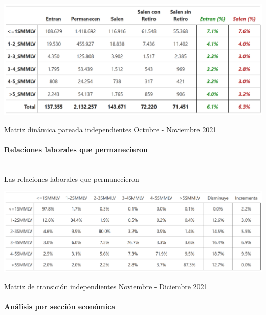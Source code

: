 \begin{table}[!htbp]
\label{tabla:independientes:matriz_dinamica_mes_referencia_21}
\centering
\includegraphics[width = 15cm]{results/02_longitudinal/salida_resumen_independientes_referencia_21.png}
\caption{Matriz dinámica pareada independientes Octubre - Noviembre 2021}%
\end{table}


\FloatBarrier
\paragraph{Relaciones laborales que permanecieron}\mbox{}\\


Las relaciones laborales que permanecieron 

\begin{table}[!htbp]
\centering
\includegraphics[width = 18cm]{results/02_longitudinal/salida_matriz_transicion_independientes_21.png}
\caption{Matriz de transición independientes Noviembre - Diciembre 2021}%
\label{tabla:independientes:matriz_transicion_mes_interes_21}
\end{table}

\FloatBarrier
\paragraph{Análisis por sección económica}\mbox{}\\


